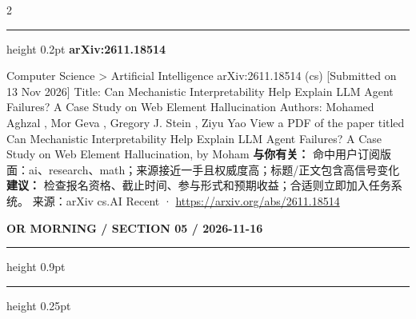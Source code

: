\documentclass[10.5pt]{ctexart}
\begin{document}
\begin{multicols}{2}
\vspace{2mm}
\hrule height 0.2pt
\vspace{2mm}
{\large\bfseries arXiv:2611.18514}\par
Computer Science > Artificial Intelligence arXiv:2611.18514 (cs) [Submitted on 13 Nov 2026] Title: Can Mechanistic Interpretability Help Explain LLM Agent Failures? A Case Study on Web Element Hallucination Authors: Mohamed Aghzal , Mor Geva , Gregory J. Stein , Ziyu Yao View a PDF of the paper titled Can Mechanistic Interpretability Help Explain LLM Agent Failures? A Case Study on Web Element Hallucination, by Moham
\textbf{与你有关：} 命中用户订阅版面：ai、research、math；来源接近一手且权威度高；标题/正文包含高信号变化
\textbf{建议：} 检查报名资格、截止时间、参与形式和预期收益；合适则立即加入任务系统。
{\footnotesize\color{ormuted} 来源：arXiv cs.AI Recent · \url{https://arxiv.org/abs/2611.18514}}
\end{multicols}
\newpage
{\small\bfseries OR MORNING / SECTION 05 / 2026-11-16}
\vspace{2mm}
\hrule height 0.9pt
\vspace{1.5mm}
\hrule height 0.25pt
\vspace{4mm}
\end{document}
